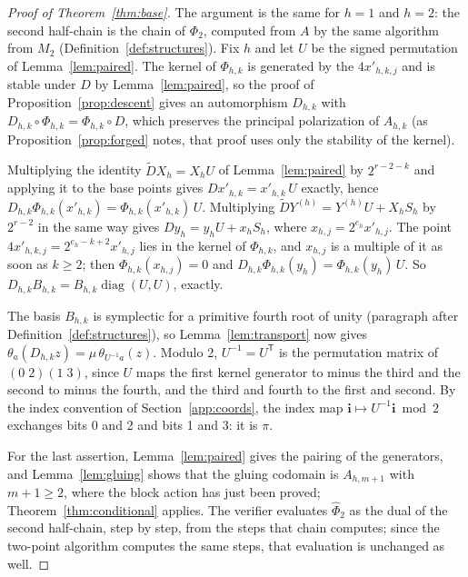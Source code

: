 \documentclass[version=preprint]{iacrcc}
\begin{document}
    \begin{proof}[Proof of Theorem~\ref{thm:base}]
        The argument is the same for $h = 1$ and $h = 2$: the second half-chain
        is the chain of $\Phi_2$, computed from $A$ by the same
        algorithm from $M_2$ (Definition~\ref{def:structures}). Fix $h$ and let
        $U$ be the signed permutation of Lemma~\ref{lem:paired}.
        The kernel of $\Phi_{h,k}$ is generated by the $4 x'_{h,k,j}$ and is
        stable under $D$ by Lemma~\ref{lem:paired}, so the proof of
        Proposition~\ref{prop:descent} gives an automorphism $D_{h,k}$ with
        $D_{h,k} \circ \Phi_{h,k} = \Phi_{h,k} \circ D$, which preserves the
        principal polarization of $A_{h,k}$ (as Proposition~\ref{prop:forged}
        notes, that proof uses only the stability of the kernel).

        Multiplying the identity $\tilde D X_h = X_h U$ of
        Lemma~\ref{lem:paired} by $2^{r-2-k}$ and applying it to the base points
        gives $D x'_{h,k} = x'_{h,k}\, U$ exactly, hence $D_{h,k}
        \Phi_{h,k}(x'_{h,k}) = \Phi_{h,k}(x'_{h,k})\, U$. Multiplying $\tilde D
        Y^{(h)} = Y^{(h)} U + X_h S_h$ by $2^{r-2}$ in the same way gives $D y_h =
        y_h U + x_h S_h$, where $x_{h,j} = 2^{e_h} x'_{h,j}$. The point $4
        x'_{h,k,j} = 2^{e_h - k + 2} x'_{h,j}$ lies in the kernel of $\Phi_{h,k}$,
        and $x_{h,j}$ is a multiple of it as soon as $k \ge 2$; then
        $\Phi_{h,k}(x_{h,j}) = 0$ and $D_{h,k} \Phi_{h,k}(y_h) = \Phi_{h,k}(y_h)\,
        U$. So $D_{h,k} B_{h,k} = B_{h,k} \operatorname{diag}(U, U)$, exactly.

        The basis $B_{h,k}$ is symplectic for a primitive fourth root of unity
        (paragraph after Definition~\ref{def:structures}), so
        Lemma~\ref{lem:transport} now gives $\theta_a(D_{h,k} z) = \mu\,
        \theta_{U^{-1} a}(z)$. Modulo 2, $U^{-1} = U^{\mathsf T}$ is the
        permutation matrix of $(0\;2)(1\;3)$, since $U$ maps the first kernel
        generator to minus the third and the second to minus the fourth, and the
        third and fourth to the first and second. By the index convention of
        Section~\ref{app:coords}, the index map $\mathbf i \mapsto U^{-1}\mathbf i
        \bmod 2$ exchanges bits 0 and 2 and bits 1 and 3: it is $\pi$.

        For the last assertion, Lemma~\ref{lem:paired} gives the pairing of the
        generators, and Lemma~\ref{lem:gluing} shows that the gluing codomain is
        $A_{h, m+1}$ with $m + 1 \ge 2$, where the block action has just been
        proved; Theorem~\ref{thm:conditional} applies. The verifier evaluates
        $\widehat\Phi_2$ as the dual of the second half-chain, step by step, from the steps
        that chain computes; since the two-point algorithm computes the same
        steps, that evaluation is unchanged as well.
    \end{proof}
\end{document}
